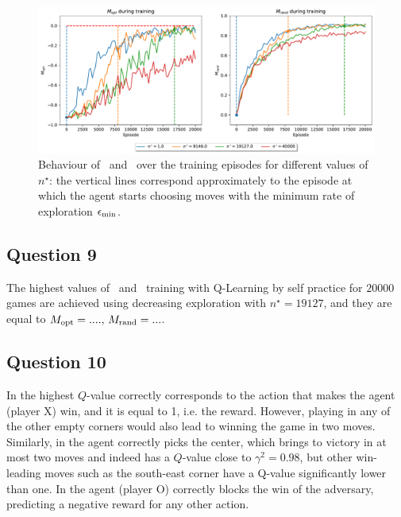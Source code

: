 \documentclass[10pt]{IEEEtran}
\begin{document}
\begin{figure}[h]
    \centering
    \includegraphics[width=\linewidth]{code/figures/performance_n_star_self.pdf}
    \caption{Behaviour of \mopt\ and \mrand\ over the training episodes for different values of $n^{\star}$:  the vertical lines correspond approximately to the episode at which the agent starts choosing moves with the minimum rate of exploration $\epsilon_{\text{min}}$.}
    \label{plot_question8}
\end{figure}



\subsection*{Question 9}
The highest values of \mopt\  and \mrand\  training with Q-Learning by self practice for $20000$ games are achieved using decreasing exploration with $n^{\star} = 19127$, and they are equal to \textcolor{red}{$M_{\text{opt}} = ...., \, M_{\text{rand}} = ...$}.

\subsection*{Question 10}
In  the highest $Q$-value correctly corresponds to the action that makes the agent (player X) win, and it is equal to 1, i.e. the reward. However, playing in any of the other empty corners would also lead to winning the game in two moves. Similarly, in  the agent correctly picks the center, which brings to victory in at most two moves and indeed has a $Q$-value close to $\gamma^2 = 0.98$, but other win-leading moves such as the south-east corner have a Q-value significantly lower than one. In  the agent (player O) correctly blocks the win of the adversary, predicting a negative reward for any other action.
\end{document}
